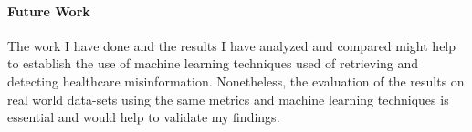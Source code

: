 \documentclass[11pt ,english,a4paper]{article}
\begin{document}
\paragraph{Future Work} The work I have done and the results I have analyzed and compared might help to establish the use of machine learning techniques used of retrieving and detecting healthcare misinformation. Nonetheless, the evaluation of the results on real world data-sets using the same metrics and machine learning techniques is essential and would help to validate my findings. 

\newpage


\end{document}
